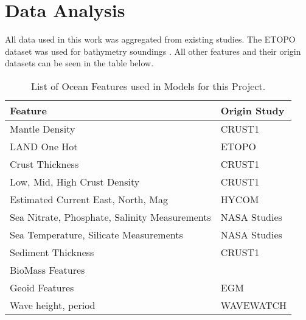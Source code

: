 \section{Data Analysis}
\setlength{\parindent}{10ex}

All data used in this work was aggregated from existing studies.
The ETOPO dataset was used for bathymetry soundings \cite{national1988etopo}.
All other features and their origin datasets can be seen in the table below. %

%

\begin{center}
    \begin{table}[htb]
        \begin{tabular}{ |p{} p{}| }
            \hline
                \textbf{Feature} & \textbf{Origin Study} \\
                \hline
                Mantle Density & CRUST1 \cite{laske2013update} \\
                LAND One Hot & ETOPO \cite{national1988etopo} \\
                Crust Thickness & CRUST1 \cite{laske2013update} \\
                Low, Mid, High Crust Density & CRUST1 \cite{laske2013update} \\
                Estimated Current East, North, Mag & HYCOM \cite{chassignet2009us} \\
                Sea Nitrate, Phosphate, Salinity Measurements & NASA Studies \cite{meissner2018salinity} \cite{parekh2005decoupling}  \\
                Sea Temperature, Silicate Measurements & NASA Studies \\
                Sediment Thickness & CRUST1 \cite{laske2013update} \\
                BioMass Features & \cite{wei2010global} \\
                Geoid Features & EGM \cite{pavlis2008earth} \\
                Wave height, period & WAVEWATCH \cite{tolman20072007} \\
            \hline
        \end{tabular}
        \label{table:FEATURE_LIST}
        \caption{List of Ocean Features used in Models for this Project.}
    \end{table}
\end{center}
